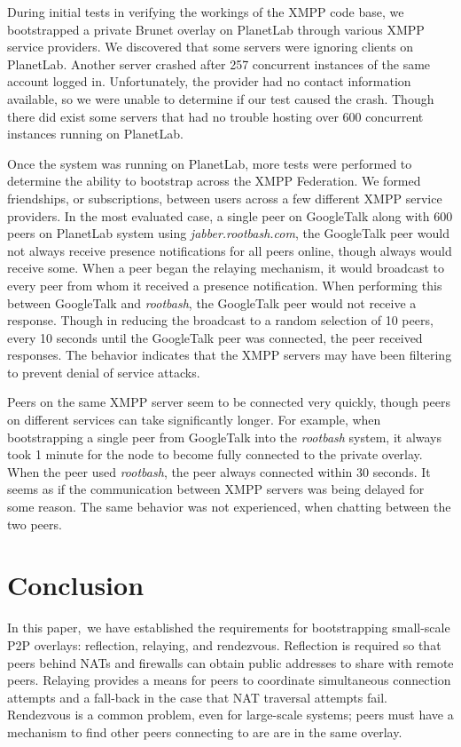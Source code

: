 \documentclass[conference]{IEEEtran}
\begin{document}
During initial tests in verifying the workings of the XMPP code base, we
bootstrapped a  private Brunet overlay on PlanetLab through various XMPP
service providers.  We discovered that some servers were ignoring clients on
PlanetLab.  Another server crashed after 257 concurrent instances of the same
account logged in.  Unfortunately, the provider had no contact information
available, so we were unable to determine if our test caused the crash.  Though
there did exist some servers that had no trouble hosting over 600 concurrent
instances running on PlanetLab.

Once the system was running on PlanetLab, more tests were performed to
determine the ability to bootstrap across the XMPP Federation.  We formed
friendships, or subscriptions, between users across a few different XMPP
service providers.  In the most evaluated case, a single peer on GoogleTalk
along with 600 peers on PlanetLab system using \textit{jabber.rootbash.com},
the GoogleTalk peer would not always receive presence notifications for all
peers online, though always would receive some.  When a peer began the relaying
mechanism, it would broadcast to every peer from whom it received a presence
notification.  When performing this between GoogleTalk and \textit{rootbash},
the GoogleTalk peer would not receive a response.  Though in reducing the
broadcast to a random selection of 10 peers, every 10 seconds until the
GoogleTalk peer was connected, the peer received responses.  The behavior
indicates that the XMPP servers may have been filtering to prevent denial of
service attacks.

Peers on the same XMPP server seem to be connected very quickly, though peers
on different services can take significantly longer.  For example, when
bootstrapping a single peer from GoogleTalk into the \textit{rootbash} system,
it always took 1 minute for the node to become fully connected to the private
overlay.  When the peer used \textit{rootbash}, the peer always connected
within 30 seconds.  It seems as if the communication between XMPP servers was
being delayed for some reason.  The same behavior was not experienced, when
chatting between the two peers.

\section{Conclusion}
\label{conclusions}

In this paper, we have established the requirements for bootstrapping
small-scale P2P overlays: reflection, relaying, and rendezvous.  Reflection is
required so that peers behind NATs and firewalls can obtain public addresses to
share with remote peers.  Relaying provides a means for peers to coordinate
simultaneous connection attempts and a fall-back in the case that NAT traversal
attempts fail.  Rendezvous is a common problem, even for large-scale systems;
peers must have a mechanism to find other peers connecting to are are in the
same overlay.  
\end{document}
